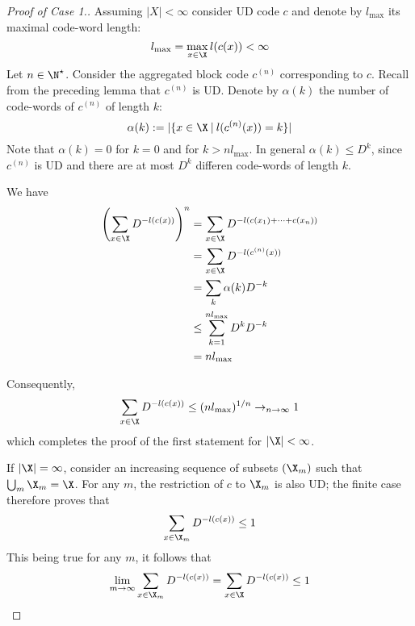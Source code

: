 \documentclass[toc]{../cs-classes/cs-classes}
\begin{document}
\begin{proof}[Proof of Case 1.]
    Assuming $|X|<\infty$ consider UD code $c$ and denote by $l_{\max}$ its maximal code-word length:
    \begin{equation*}
        l_{\max}=\max_{x\in\X} l(c(x)) <\infty
    \end{equation*}
    Let $n\in\N^\star$. Consider the aggregated block code $c^{(n)}$ corresponding to $c$. Recall from the preceding lemma that $c^{(n)}$ is UD. Denote by $\alpha(k)$ the number of code-words of $c^{(n)}$ of length $k$:
    \begin{equation*}
        \alpha(k) := |\{x\in\X \: | \: l(c^{(n)}(x)) = k\}|
    \end{equation*}
    Note that $\alpha(k)=0$ for $k=0$ and for $k>nl_{\max}$. In general $\alpha(k)\leq D^k$, since $c^{(n)}$ is UD and there are at most $D^k$ differen code-words of length $k$.

    We have
    \begin{equation*}
        \begin{aligned}
            \left(\sum_{x\in\X} D^{-l(c(x))}\right)^n &= \sum_{x\in\X} D^{-l(c(x_1)+\dots+c(x_n))}\\
            &= \sum_{x\in\X} D^{-l(c^{(n)}(x))}\\
            &= \sum_{k} \alpha(k)D^{-k}\\
            &\leq \sum_{k=1}^{nl_{\max}} D^kD^{-k}\\
            &= nl_{\max}
        \end{aligned}
    \end{equation*}

    Consequently,
    \begin{equation*}
        \sum_{x\in\X} D^{-l(c(x))} \leq (nl_{\max})^{1/n} \to_{n\to\infty} 1
    \end{equation*}
    which completes the proof of the first statement for $|\X|<\infty$.

    If $|\X|=\infty$, consider an increasing sequence of subsets $(\X_m)$ such that $\bigcup_m \X_m = \X$. For any $m$, the restriction of $c$ to $\X_m$ is also UD; the finite case therefore proves that
    \begin{equation*}
        \sum_{x\in\X_m}D^{-l(c(x))}\leq 1
    \end{equation*}
    This being true for any $m$, it follows that 
    \begin{equation*}
        \lim_{m\to\infty}\sum_{x\in\X_m}D^{-l(c(x))} = \sum_{x\in\X}D^{-l(c(x))} \leq 1
    \end{equation*}
\end{proof}
\end{document}
